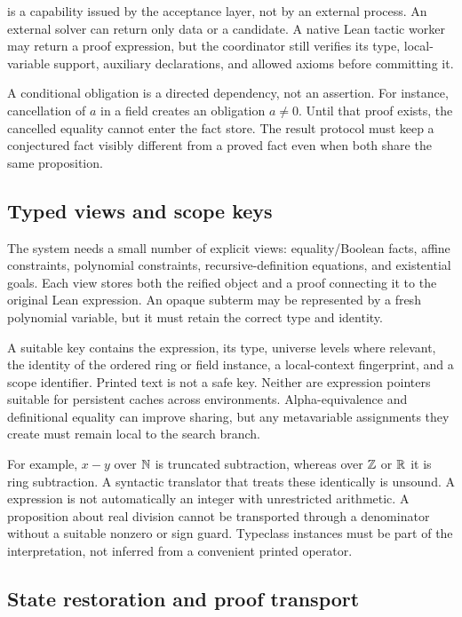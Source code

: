  is a capability issued by the acceptance layer, not by an external process. An external solver can return only data or a candidate. A native Lean tactic worker may return a proof expression, but the coordinator still verifies its type, local-variable support, auxiliary declarations, and allowed axioms before committing it.

A conditional obligation is a directed dependency, not an assertion. For instance, cancellation of $a$ in a field creates an obligation $a\ne0$. Until that proof exists, the cancelled equality cannot enter the fact store. The result protocol must keep a conjectured fact visibly different from a proved fact even when both share the same proposition.

\subsection{Typed views and scope keys}

The system needs a small number of explicit views: equality/Boolean facts, affine constraints, polynomial constraints, recursive-definition equations, and existential goals. Each view stores both the reified object and a proof connecting it to the original Lean expression. An opaque subterm may be represented by a fresh polynomial variable, but it must retain the correct type and identity.

A suitable key contains the expression, its type, universe levels where relevant, the identity of the ordered ring or field instance, a local-context fingerprint, and a scope identifier. Printed text is not a safe key. Neither are expression pointers suitable for persistent caches across environments. Alpha-equivalence and definitional equality can improve sharing, but any metavariable assignments they create must remain local to the search branch.

For example, $x-y$ over $\mathbb{N}$ is truncated subtraction, whereas over $\mathbb{Z}$ or $\mathbb{R}$ it is ring subtraction. A syntactic translator that treats these identically is unsound. A  expression is not automatically an integer with unrestricted arithmetic. A proposition about real division cannot be transported through a denominator without a suitable nonzero or sign guard. Typeclass instances must be part of the interpretation, not inferred from a convenient printed operator.

\subsection{State restoration and proof transport}

